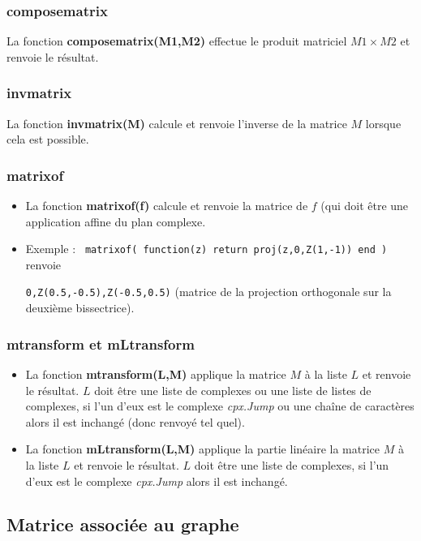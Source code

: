 \subsubsection{composematrix}
La fonction \textbf{composematrix(M1,M2)} effectue le produit matriciel $M1\times M2$ et renvoie le résultat.

\subsubsection{invmatrix}
La fonction \textbf{invmatrix(M)} calcule et renvoie l'inverse de la matrice $M$ lorsque cela est possible.

\subsubsection{matrixof}
\begin{itemize}
    \item La fonction \textbf{matrixof(f)} calcule et renvoie la matrice de $f$ (qui doit être une application affine du plan complexe.
    \item Exemple : \texttt{ matrixof( function(z) return proj(z,{0,Z(1,-1)}) end )} renvoie \par
     \texttt{{0,Z(0.5,-0.5),Z(-0.5,0.5)}} (matrice de la projection orthogonale sur la deuxième bissectrice).
\end{itemize}

\subsubsection{mtransform et mLtransform}
\begin{itemize}
    \item La fonction \textbf{mtransform(L,M)} applique la matrice $M$ à la liste $L$ et renvoie le résultat. $L$ doit être une liste de complexes ou une liste de listes de complexes, si l'un d'eux est le complexe \emph{cpx.Jump} ou une chaîne de caractères alors il est inchangé (donc renvoyé tel quel).
    \item La fonction \textbf{mLtransform(L,M)} applique la partie linéaire la matrice $M$ à la liste $L$ et renvoie le résultat. $L$ doit être une liste de complexes, si l'un d'eux est le complexe \emph{cpx.Jump} alors il est inchangé.
\end{itemize}

\subsection{Matrice associée au graphe}

